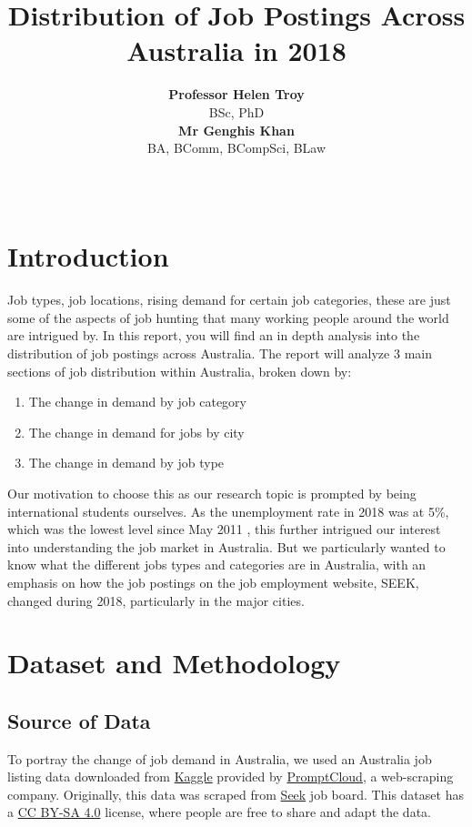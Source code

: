 \documentclass[11pt,a4paper,]{article}
\title{Distribution of Job Postings Across Australia in 2018}
\author{\sf\Large\textbf{Professor Helen Troy}\\ {\sf\large BSc, PhD\\[0.5cm]} \sf\Large\textbf{Mr Genghis Khan}\\ {\sf\large BA, BComm, BCompSci, BLaw\\[0.5cm]}}
\date{\sf\Date~\Month~\Year}
\makeatletter
\providecommand{\tightlist}{%
  \setlength{\itemsep}{0pt}\setlength{\parskip}{0pt}}
\def\titlepage{\front{\expandafter{\@title}}{\@author}{\@organization}}
\makeatother
\begin{document}
\titlepage

{
\setcounter{tocdepth}{2}
\tableofcontents
}
\hypertarget{introduction}{%
\section{Introduction}\label{introduction}}

Job types, job locations, rising demand for certain job categories, these are just some of the aspects of job hunting that many working people around the world are intrigued by. In this report, you will find an in depth analysis into the distribution of job postings across Australia. The report will analyze 3 main sections of job distribution within Australia, broken down by:

\begin{enumerate}
\def\labelenumi{\arabic{enumi})}
\tightlist
\item
  The change in demand by job category
\item
  The change in demand for jobs by city
\item
  The change in demand by job type
\end{enumerate}

Our motivation to choose this as our research topic is prompted by being international students ourselves. As the unemployment rate in 2018 was at 5\%, which was the lowest level since May 2011 \textcite{unemployment}, this further intrigued our interest into understanding the job market in Australia. But we particularly wanted to know what the different jobs types and categories are in Australia, with an emphasis on how the job postings on the job employment website, SEEK, changed during 2018, particularly in the major cities.

\hypertarget{dataset-and-methodology}{%
\section{Dataset and Methodology}\label{dataset-and-methodology}}

\hypertarget{source-of-data}{%
\subsection{Source of Data}\label{source-of-data}}

To portray the change of job demand in Australia, we used an Australia job listing data downloaded from \href{https://www.kaggle.com/PromptCloudHQ/australian-job-listings-data-from-seek-job-board}{Kaggle} provided by \href{https://www.promptcloud.com}{PromptCloud}, a web-scraping company. Originally, this data was scraped from \href{https://www.seek.com.au}{Seek} job board. This dataset has a \href{https://creativecommons.org/licenses/by-sa/4.0/}{CC BY-SA 4.0} license, where people are free to share and adapt the data.
\end{document}
